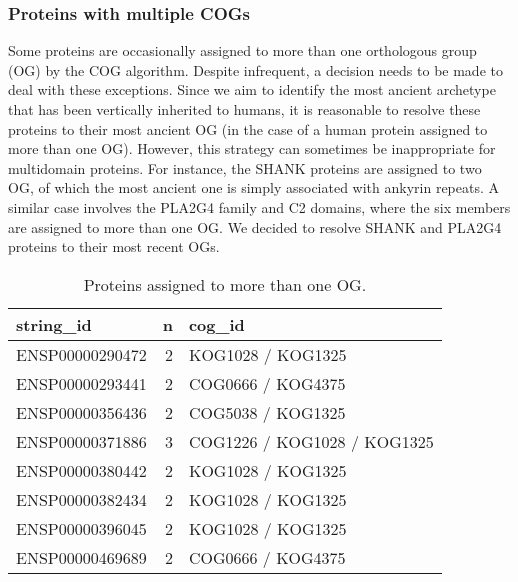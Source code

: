\hypertarget{proteins-with-multiple-cogs}{%
\subsubsection{Proteins with multiple
COGs}\label{proteins-with-multiple-cogs}}

Some proteins are occasionally assigned to more than one orthologous
group (OG) by the COG algorithm. Despite infrequent, a decision needs to
be made to deal with these exceptions. Since we aim to identify the most
ancient archetype that has been vertically inherited to humans, it is
reasonable to resolve these proteins to their most ancient OG (in the
case of a human protein assigned to more than one OG). However, this
strategy can sometimes be inappropriate for multidomain proteins. For
instance, the SHANK proteins are assigned to two OG, of which the most
ancient one is simply associated with ankyrin repeats. A similar case
involves the PLA2G4 family and C2 domains, where the six members are
assigned to more than one OG. We decided to resolve SHANK and PLA2G4
proteins to their most recent OGs.

\begin{Shaded}
\end{Shaded}

\begin{table}[H]

\caption{\label{tab:unnamed-chunk-6}Proteins assigned to more than one OG.}
\begin{tabular}[t]{lrl}
\toprule
string\_id & n & cog\_id\\
\midrule
\rowcolor{gray!6}  ENSP00000290472 & 2 & KOG1028 / KOG1325\\
ENSP00000293441 & 2 & COG0666 / KOG4375\\
\rowcolor{gray!6}  ENSP00000356436 & 2 & COG5038 / KOG1325\\
ENSP00000371886 & 3 & COG1226 / KOG1028 / KOG1325\\
\rowcolor{gray!6}  ENSP00000380442 & 2 & KOG1028 / KOG1325\\
ENSP00000382434 & 2 & KOG1028 / KOG1325\\
\rowcolor{gray!6}  ENSP00000396045 & 2 & KOG1028 / KOG1325\\
ENSP00000469689 & 2 & COG0666 / KOG4375\\
\bottomrule
\end{tabular}
\end{table}

